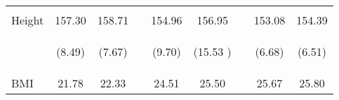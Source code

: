 \documentclass{article}[11pt,subeqn]
\begin{document}
\begin{spacing}{1.5}
\begin{table}[ht]
\begin{center}
\begin{tabular}{lccp{5mm}ccp{5mm}cc}
\begin{footnotesize}\end{footnotesize}	&	\begin{footnotesize}\end{footnotesize}	&	\begin{footnotesize}\end{footnotesize}	&	\begin{footnotesize}\end{footnotesize} &	\begin{footnotesize}\end{footnotesize}	&	\begin{footnotesize}\end{footnotesize}	&	\begin{footnotesize}\end{footnotesize} &	\begin{footnotesize}\end{footnotesize}	&	\begin{footnotesize}\end{footnotesize}		\\
Height	&	157.30	&	158.71	&	&	154.96	&	156.95	&	&	153.08	&	154.39		\\
\begin{footnotesize}\end{footnotesize}	& \begin{footnotesize} (8.49)\end{footnotesize} & \begin{footnotesize} (7.67)\end{footnotesize} & \begin{footnotesize} 	\end{footnotesize} & \begin{footnotesize} (9.70)\end{footnotesize} & \begin{footnotesize} (15.53	)\end{footnotesize} & \begin{footnotesize} 	\end{footnotesize} & \begin{footnotesize} (6.68)\end{footnotesize} & \begin{footnotesize} (6.51)\end{footnotesize}	\\
BMI	&	21.78	&	22.33	&	&	24.51	&	25.50	&	&	25.67	&	25.80		\\

\end{tabular}
\end{center}
\end{table}
\end{spacing}
\end{document}

